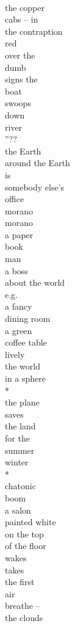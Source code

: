 \documentclass[smalldemyvopaper,11pt,twoside,onecolumn,openright,extrafontsizes]{memoir}
\begin{document}
\\the copper
\\cabs -- in
\\the contraption
\\red
\\over the
\\dumb
\\signs the
\\boat
\\swoops
\\down
\\river
\\''??
\\the Earth
\\around the Earth
\\is
\\somebody else's
\\office
\\morano
\\morano
\\a paper
\\book
\\man
\\a boss
\\about the world
\\e.g.
\\a fancy
\\dining room
\\a green
\\coffee table
\\lively
\\the world
\\in a sphere
\\*
\\the plane
\\saves
\\the land
\\for the
\\summer
\\winter
\\*
\\chatonic
\\boom
\\a salon
\\painted white
\\on the top
\\of the floor
\\wakes
\\takes
\\the first
\\air
\\breathe --
\\the clouds
\end{document}
